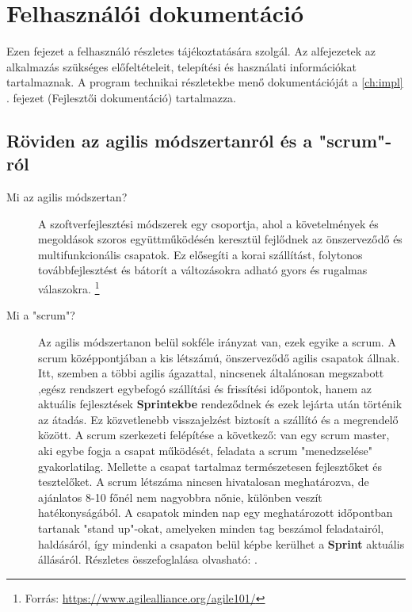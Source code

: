 \chapter{Felhasználói dokumentáció} %
\label{ch:user}

Ezen fejezet a felhasználó részletes tájékoztatására szolgál. Az alfejezetek az alkalmazás szükséges előfeltételeit, telepítési és használati információkat tartalmaznak. A program technikai részletekbe menő dokumentációját a \ref{ch:impl} . fejezet (Fejlesztői dokumentáció) tartalmazza.


\section{Röviden az agilis módszertanról és a  "scrum"-ról} %

\begin{description}
	\item[Mi az agilis módszertan?] A szoftverfejlesztési módszerek egy csoportja, ahol a követelmények és megoldások szoros együttműködésén keresztül fejlődnek az önszerveződő  és 		     	multifunkcionális csapatok. Ez elősegíti a korai szállítást, folytonos továbbfejlesztést és bátorít a változásokra adható gyors és rugalmas válaszokra. \footnote{Forrás: \url{https://www.agilealliance.org/agile101/}}
	\item[Mi a "scrum"?] Az agilis módszertanon belül sokféle irányzat van, ezek egyike a scrum. A scrum középpontjában a kis létszámú, önszerveződő agilis csapatok állnak. Itt,
 szemben a többi agilis ágazattal, nincsenek általánosan megszabott ,egész rendszert egybefogó szállítási és frissítési időpontok, hanem az aktuális fejlesztések \textbf{Sprintekbe} rendeződnek és ezek lejárta után történik az átadás. Ez közvetlenebb visszajelzést biztosít a szállító és a megrendelő között. A scrum szerkezeti felépítése a következő: van egy scrum master, aki egybe fogja a csapat működését, feladata a scrum "menedzselése" gyakorlatilag. Mellette a csapat tartalmaz természetesen fejlesztőket és tesztelőket. A scrum létszáma nincsen hivatalosan meghatározva, de ajánlatos 8-10 főnél nem nagyobbra nőnie, különben veszít hatékonyságából. A csapatok minden nap egy meghatározott időpontban tartanak "stand up"-okat, amelyeken minden tag beszámol feladatairól, haldásáról, így mindenki a csapaton belül képbe kerülhet a \textbf{Sprint} aktuális állásáról. Részletes összefoglalása olvasható: \cite{agilis}.
\end{description}

